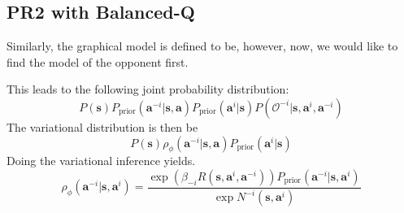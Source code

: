 \subsection{PR2 with Balanced-Q}
Similarly, the graphical model is defined to be, however, now, we would like to find the model of the opponent first. 
\begin{figure}[ht]
    \begin{minipage}[t]{0.5\linewidth}
    \centering
    \end{minipage}%
    \begin{minipage}[t]{0.5\linewidth}
    \end{minipage}
\end{figure}
This leads to the following joint probability distribution:
\begin{equation}
    P(\boldsymbol{s})P_{\text{prior}}(\boldsymbol{a}^{-i} | \boldsymbol{s}, \boldsymbol{a}) P_{\text{prior}}(\boldsymbol{a}^i | \boldsymbol{s}) P(\mathcal{O}^{-i} | \boldsymbol{s}, \boldsymbol{a}^{i}, \boldsymbol{a}^{-i})
\end{equation}
The variational distribution is then be 
\begin{equation}
    P(\boldsymbol{s}) \rho_{\phi}(\boldsymbol{a}^{-i} | \boldsymbol{s}, \boldsymbol{a}) P_{\text{prior}} (\boldsymbol{a}^i | \boldsymbol{s})
\end{equation}
Doing the variational inference yields. 
\begin{equation}
    \rho_{\phi} (\boldsymbol{a}^{-i} | \boldsymbol{s}, \boldsymbol{a}^{i}) = \frac{\exp(\beta_{-i} R(\boldsymbol{s}, \boldsymbol{a}^i, \boldsymbol{a}^{-i})) P_{\text{prior}}(\boldsymbol{a}^{-i} | \boldsymbol{s}, \boldsymbol{a}^{i})}{ \exp N^{-i}(\boldsymbol{s}, \boldsymbol{a}^{i})}
\end{equation}
